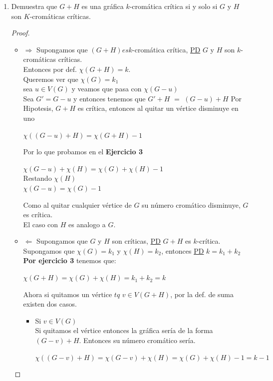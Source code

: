 \documentclass{article}
\begin{document}
\begin{enumerate}
\begin{proof}
  \end{proof}
  \newpage
\item Demuestra que $G+H$ es una gráfica $k$-cromática crítica si y solo si $G$ y $H$ son $K$-cromáticas críticas. \\
  \begin{proof}
    \begin{itemize}
    \item $\Longrightarrow$ Supongamos que $(G+H) es k$-cromática crítica, \underline{PD} $G$ y $H$ son $k$-cromáticas críticas. \\
      Entonces por def. $\chi(G+H) = k$. \\
      Queremos ver que $\chi(G) = k_1$ \\
      sea $u \in V(G)$ y veamos que pasa con $\chi(G-u)$ \\
      Sea $G' = G -u$ y entonces tenemos que $G'+H$ $=$ $(G-u) +H$ Por Hipotesis, $G+H$ es crítica, entonces al quitar un vértice disminuye en uno
      \begin{center}
        $\chi((G-u)+H) = \chi(G+H) - 1$
      \end{center}
      Por lo que probamos en el \textbf{Ejercicio 3}
      \begin{center}
        $\chi(G-u) + \chi(H) = \chi(G) + \chi(H) - 1$ \\
        Restando $\chi(H)$ \\
     
        $\chi(G-u) = \chi(G) - 1$ \\
       \end{center}
       Como al quitar cualquier vértice de $G$ su número cromático disminuye, $G$ es crítica.  \\
       El caso con $H$ es analogo a $G$. \\
     \item $\Leftarrow$ Supongamos que $G$ y $H$ son críticas, \underline{PD} $G+H$ es $k$-crítica. \\
       Supongamos que $\chi(G) = k_1$ y $\chi(H) = k_2$, entonces \underline{PD} $k = k_1+ k_2$ \\
       \textbf{ Por ejercicio 3} tenemos que: \\
       \begin{center}
         $\chi(G+H) = \chi(G) + \chi(H) = k_1 + k_2 = k$
       \end{center}
       Ahora si quitamos un vértice $tq$ $v \in V(G+H)$, por la def. de suma existen dos casos.
       \begin{itemize}
       \item Si $v \in V(G)$ \\
         Si quitamos el vértice entonces la gráfica sería de la forma $(G-v) +H$. Entonces su número cromático sería. \\
         \begin{center}
           $\chi((G-v)+ H) = \chi(G-v) + \chi(H) = \chi(G) + \chi(H) - 1 = k-1$
         \end{center}
         

\end{itemize}
\end{itemize}
\end{proof}
\end{enumerate}
\end{document}
